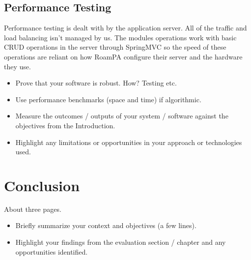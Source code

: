 \section{Performance Testing}

Performance testing is dealt with by the application server. All of the traffic and load balancing isn't managed by us. The modules operations work with basic CRUD operations in the server through SpringMVC so the speed of these operations are reliant on how RoamPA configure their server and the hardware they use.

\begin{itemize}
\item Prove that your software is robust. How? Testing etc. 
\item Use performance benchmarks (space and time) if algorithmic.
\item Measure the outcomes / outputs of your system / software against the objectives from the Introduction.
\item Highlight any limitations or opportunities in your approach or technologies used.
\end{itemize}

\chapter{Conclusion}
About three pages.

\begin{itemize}
\item Briefly summarize your context and objectives (a few lines).
\item Highlight your findings from the evaluation section / chapter and any opportunities identified.
\end{itemize}